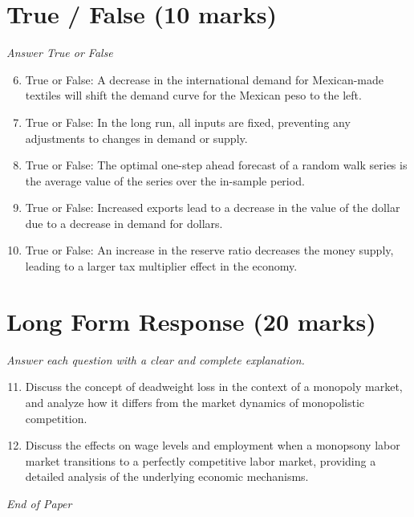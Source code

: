 \documentclass[12pt]{article}
\begin{document}
\section*{True / False (10 marks)}
\textit{Answer True or False}
\begin{enumerate}[label=\arabic*.]
\setcounter{enumi}{5}
\item True or False: A decrease in the international demand for Mexican-made textiles will shift the demand curve for the Mexican peso to the left.
\item True or False: In the long run, all inputs are fixed, preventing any adjustments to changes in demand or supply.
\item True or False: The optimal one-step ahead forecast of a random walk series is the average value of the series over the in-sample period.
\item True or False: Increased exports lead to a decrease in the value of the dollar due to a decrease in demand for dollars.
\item True or False: An increase in the reserve ratio decreases the money supply, leading to a larger tax multiplier effect in the economy.
\end{enumerate}

\section*{Long Form Response (20 marks)}
\textit{Answer each question with a clear and complete explanation.}
\begin{enumerate}[label=\arabic*.]
\setcounter{enumi}{10}
\item Discuss the concept of deadweight loss in the context of a monopoly market, and analyze how it differs from the market dynamics of monopolistic competition.
\item Discuss the effects on wage levels and employment when a monopsony labor market transitions to a perfectly competitive labor market, providing a detailed analysis of the underlying economic mechanisms.
\end{enumerate}

\vfill
\noindent\textit{End of Paper}
\end{document}
